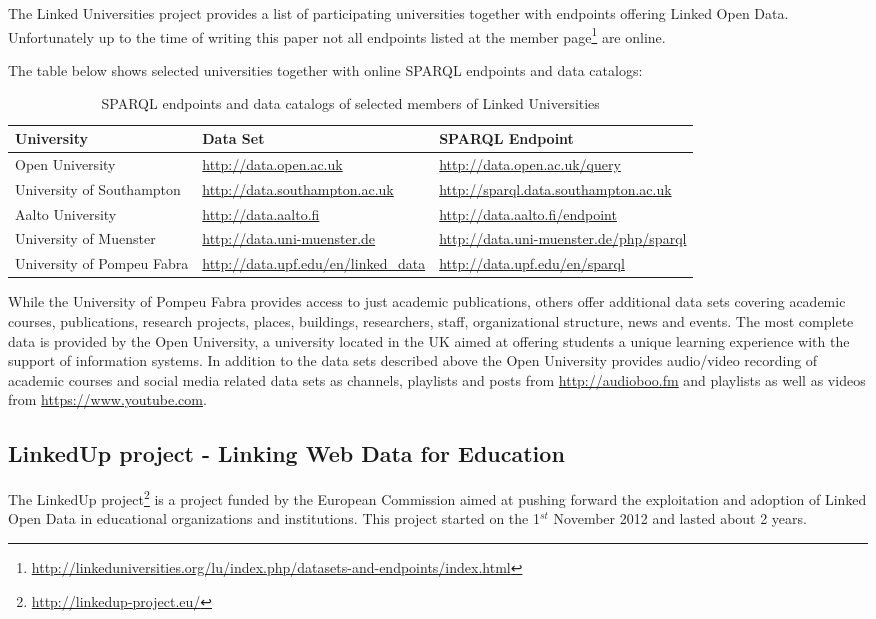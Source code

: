 \documentclass{article}
\begin{document}
The Linked Universities project provides a list of participating universities together with endpoints offering Linked Open Data. 
Unfortunately up to the time of writing this paper not all endpoints listed at the member page\footnote{\label{LOD_endpoints}\url{http://linkeduniversities.org/lu/index.php/datasets-and-endpoints/index.html}} are online. 

The table below shows selected universities together with online SPARQL endpoints and data catalogs: 

\begin{table}[H]
	\begin{tabularx}{\textwidth}{l|X|X}
		University & Data Set & SPARQL Endpoint \\
		\hline
		Open University & \url{http://data.open.ac.uk} & \url{http://data.open.ac.uk/query}\\
		University of Southampton & \url{http://data.southampton.ac.uk} & \url{http://sparql.data.southampton.ac.uk}\\
		Aalto University & \url{http://data.aalto.fi} & \url{http://data.aalto.fi/endpoint}\\
		University of Muenster & \url{http://data.uni-muenster.de} & \url{http://data.uni-muenster.de/php/sparql}\\
		University of Pompeu Fabra & \url{http://data.upf.edu/en/linked_data} & \url{http://data.upf.edu/en/sparql}\\
	\end{tabularx}
	\caption{SPARQL endpoints and data catalogs of selected members of Linked Universities}
	\label{table:sparql_data_catalog_linked_universities}
\end{table}

While the University of Pompeu Fabra provides access to just academic publications, others offer additional data sets covering academic 
courses, publications, research projects, places,  buildings, researchers,  staff, organizational structure, news and events. The most
complete data is provided by the Open University, a university located in the UK aimed at offering students a unique learning experience with
the support of information systems. In addition to the data sets described above the Open University provides audio/video recording of academic courses 
and social media related data sets as channels, playlists and posts from \url{http://audioboo.fm} and playlists as well as videos from \url{https://www.youtube.com}. 

\subsection{LinkedUp project - Linking Web Data for Education}
\label{sec:linkedup}
The LinkedUp project\footnote{\url{http://linkedup-project.eu/}} is a project funded by the European Commission aimed at pushing forward the exploitation and adoption of Linked Open Data in educational organizations and institutions. This project started on the 1$^{st}$ November 2012 and lasted about 2 years. 
\end{document}
